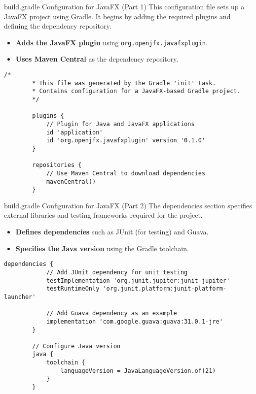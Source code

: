 \documentclass[aspectratio=169, table]{beamer}
\begin{document}
\begin{frame}[fragile]{build.gradle Configuration for JavaFX (Part 1)}
	\vspace{20pt}
	This configuration file sets up a JavaFX project using Gradle. It begins by adding the required plugins and defining the dependency repository.
	\begin{itemize}
		\item \textbf{Adds the JavaFX plugin} using \texttt{org.openjfx.javafxplugin}.
		\item \textbf{Uses Maven Central} as the dependency repository.
	\end{itemize}
	\begin{lstlisting}[style=JavaStyle]
		/*
		* This file was generated by the Gradle 'init' task.
		* Contains configuration for a JavaFX-based Gradle project.
		*/
		
		plugins {
			// Plugin for Java and JavaFX applications
			id 'application'
			id 'org.openjfx.javafxplugin' version '0.1.0'
		}
		
		repositories {
			// Use Maven Central to download dependencies
			mavenCentral()
		}
	\end{lstlisting}
\end{frame}

\begin{frame}[fragile]{build.gradle Configuration for JavaFX (Part 2)}
	\vspace{20pt}
	The dependencies section specifies external libraries and testing frameworks required for the project.
	\begin{itemize}
		\item \textbf{Defines dependencies} such as JUnit (for testing) and Guava.
		\item \textbf{Specifies the Java version} using the Gradle toolchain.
	\end{itemize}
	\begin{lstlisting}[style=JavaStyle]
		dependencies {
			// Add JUnit dependency for unit testing
			testImplementation 'org.junit.jupiter:junit-jupiter'
			testRuntimeOnly 'org.junit.platform:junit-platform-launcher'
			
			// Add Guava dependency as an example
			implementation 'com.google.guava:guava:31.0.1-jre'
		}
		
		// Configure Java version
		java {
			toolchain {
				languageVersion = JavaLanguageVersion.of(21)
			}
		}
	\end{lstlisting}
\end{frame}
\end{document}
